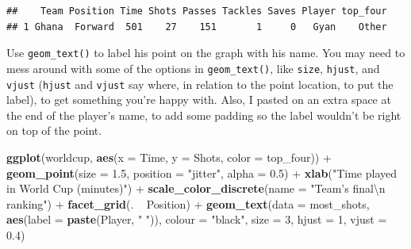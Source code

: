 \documentclass[]{book}
\makeatletter
\newenvironment{Shaded}{\begin{snugshade}}{\end{snugshade}}
\newcommand{\KeywordTok}[1]{\textcolor[rgb]{0.13,0.29,0.53}{\textbf{{#1}}}}
\newcommand{\DataTypeTok}[1]{\textcolor[rgb]{0.13,0.29,0.53}{{#1}}}
\newcommand{\DecValTok}[1]{\textcolor[rgb]{0.00,0.00,0.81}{{#1}}}
\newcommand{\FloatTok}[1]{\textcolor[rgb]{0.00,0.00,0.81}{{#1}}}
\newcommand{\CharTok}[1]{\textcolor[rgb]{0.31,0.60,0.02}{{#1}}}
\newcommand{\StringTok}[1]{\textcolor[rgb]{0.31,0.60,0.02}{{#1}}}
\newcommand{\NormalTok}[1]{{#1}}
\newenvironment{kframe}{%
\medskip{}
\setlength{\fboxsep}{.8em}
 \def\at@end@of@kframe{}%
 \ifinner\ifhmode%
  \def\at@end@of@kframe{\end{minipage}}%
  \begin{minipage}{\columnwidth}%
 \fi\fi%
 \def\FrameCommand##1{\hskip\@totalleftmargin \hskip-\fboxsep
 \colorbox{shadecolor}{##1}\hskip-\fboxsep
     \hskip-\linewidth \hskip-\@totalleftmargin \hskip\columnwidth}%
 \MakeFramed {\advance\hsize-\width
   \@totalleftmargin\z@ \linewidth\hsize
   \@setminipage}}%
 {\par\unskip\endMakeFramed%
 \at@end@of@kframe}
\renewenvironment{Shaded}{\begin{kframe}}{\end{kframe}}
\makeatother
\begin{document}
\begin{Shaded}
\end{Shaded}

\begin{verbatim}
##    Team Position Time Shots Passes Tackles Saves Player top_four
## 1 Ghana  Forward  501    27    151       1     0   Gyan    Other
\end{verbatim}

Use \texttt{geom\_text()} to label his point on the graph with his name.
You may need to mess around with some of the options in
\texttt{geom\_text()}, like \texttt{size}, \texttt{hjust}, and
\texttt{vjust} (\texttt{hjust} and \texttt{vjust} say where, in relation
to the point location, to put the label), to get something you're happy
with. Also, I pasted on an extra space at the end of the player's name,
to add some padding so the label wouldn't be right on top of the point.

\begin{Shaded}
\begin{Highlighting}[]
\KeywordTok{ggplot}\NormalTok{(worldcup, }\KeywordTok{aes}\NormalTok{(}\DataTypeTok{x =} \NormalTok{Time, }\DataTypeTok{y =} \NormalTok{Shots,}
                     \DataTypeTok{color =} \NormalTok{top_four)) +}
\StringTok{        }\KeywordTok{geom_point}\NormalTok{(}\DataTypeTok{size =} \FloatTok{1.5}\NormalTok{, }\DataTypeTok{position =} \StringTok{"jitter"}\NormalTok{,}
                   \DataTypeTok{alpha =} \FloatTok{0.5}\NormalTok{)  +}\StringTok{ }
\StringTok{        }\KeywordTok{xlab}\NormalTok{(}\StringTok{"Time played in World Cup (minutes)"}\NormalTok{) +}\StringTok{ }
\StringTok{        }\KeywordTok{scale_color_discrete}\NormalTok{(}\DataTypeTok{name =} \StringTok{"Team's final}\CharTok{\textbackslash{}n}\StringTok{ ranking"}\NormalTok{) +}\StringTok{ }
\StringTok{        }\KeywordTok{facet_grid}\NormalTok{(. ~}\StringTok{ }\NormalTok{Position) +}\StringTok{ }
\StringTok{        }\KeywordTok{geom_text}\NormalTok{(}\DataTypeTok{data =} \NormalTok{most_shots,}
                  \KeywordTok{aes}\NormalTok{(}\DataTypeTok{label =} \KeywordTok{paste}\NormalTok{(Player, }\StringTok{" "}\NormalTok{)),}
                  \DataTypeTok{colour =} \StringTok{"black"}\NormalTok{, }\DataTypeTok{size =} \DecValTok{3}\NormalTok{,}
                  \DataTypeTok{hjust =} \DecValTok{1}\NormalTok{, }\DataTypeTok{vjust =} \FloatTok{0.4}\NormalTok{)}
\end{Highlighting}
\end{Shaded}
\end{document}
